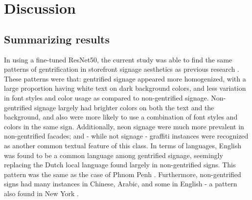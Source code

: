 \newpage
\section{Discussion}
\label{sec:discussion}


\subsection{Summarizing results}

In using a fine-tuned ResNet50, the current study was able to find the same patterns of gentrification in storefront signage aesthetics as previous research \cite{rahman_signage_2020, trinch_signsays_2017, snajdr_oldschool_2018, snajdr_preserve_2022}. These patterns were that: gentrified signage appeared more homogenized, with a large proportion having white text on dark background colors, and less variation in font styles and color usage as compared to non-gentrified signage. Non-gentrified signage largely had brighter colors on both the text and the background, and also were more likely to use a combination of font styles and colors in the same sign. Additionally, neon signage were much more prevalent in non-gentrified facades; and - while not signage - graffiti instances were recognized as another common textual feature of this class. In terms of languages, English was found to be a common language among gentrified signage, seemingly replacing the Dutch local language found largely in non-gentrified signs. This pattern was the same as the case of Phnom Penh \cite{kasanga_map_2012}. Furthermore, non-gentrified signs had many instances in Chinese, Arabic, and some in English - a pattern also found in New York \cite{trinch_signsays_2017}.

